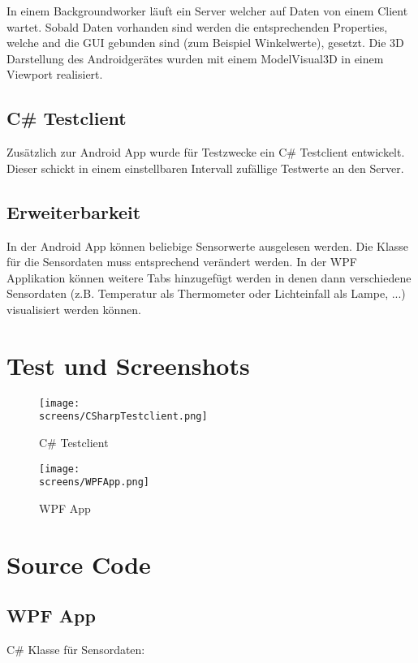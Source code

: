\documentclass[12pt,a4paper]{article}
\begin{document}
In einem Backgroundworker läuft ein Server welcher auf Daten von einem Client wartet. Sobald Daten vorhanden sind werden die entsprechenden Properties, welche and die GUI gebunden sind (zum Beispiel Winkelwerte), gesetzt. Die 3D Darstellung des Androidgerätes wurden mit einem ModelVisual3D in einem Viewport realisiert.

\subsection{C\# Testclient}
Zusätzlich zur Android App wurde für Testzwecke ein C\# Testclient entwickelt. Dieser schickt in einem einstellbaren Intervall zufällige Testwerte an den Server.

\subsection{Erweiterbarkeit}
In der Android App können beliebige Sensorwerte ausgelesen werden. Die Klasse für die Sensordaten muss entsprechend verändert werden. In der WPF Applikation können weitere Tabs hinzugefügt werden in denen dann verschiedene Sensordaten (z.B. Temperatur als Thermometer oder Lichteinfall als Lampe, ...) visualisiert werden können.

\newpage
\section{Test und Screenshots}

\begin{figure}[!htb]%
\centering
\texttt{[image: \\screens/CSharpTestclient.png]}%
\caption{C\# Testclient}%
\label{}%
\end{figure}

\begin{figure}[!htb]%
\centering
\texttt{[image: \\screens/WPFApp.png]}%
\caption{WPF App}%
\label{}%
\end{figure}



\newpage
\section{Source Code}

\subsection{WPF App}
C\# Klasse für Sensordaten:

\end{document}

